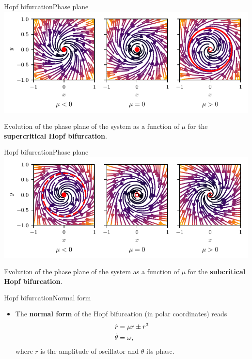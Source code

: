 \documentclass[usenames,dvipsnames,svgnames,10pt,aspectratio=169]{beamer}
\begin{document}
\begin{frame}[t, c]{Hopf bifurcation}{Phase plane}
	\centering
	\includegraphics[width=.75\textwidth]{supercritical_hopf_bifurcation_phase_plane}

	Evolution of the phase plane of the system as a function of $\mu$ for the \alert{\textbf{supercritical Hopf bifurcation}}.

	\vspace{1cm}
\end{frame}


\begin{frame}[t, c]{Hopf bifurcation}{Phase plane}
	\centering
	\includegraphics[width=.75\textwidth]{subcritical_hopf_bifurcation_phase_plane}

	Evolution of the phase plane of the system as a function of $\mu$ for the \alert{\textbf{subcritical Hopf bifurcation}}.

	\vspace{1cm}
\end{frame}

\begin{frame}[t, c]{Hopf bifurcation}{Normal form}
	\begin{itemize}
		\item The \alert{\textbf{normal form}} of the Hopf bifurcation (in polar coordinates) reads
		\begin{equation}
			\begin{aligned}
				\dot{r} & = \mu r \pm r^3 \\
				\dot{\theta} & = \omega,
			\end{aligned}
			\notag
		\end{equation}
		where $r$ is the amplitude of oscillator and $\theta$ its phase.
	\end{itemize}

	\vspace{1cm}
\end{frame}
\end{document}
